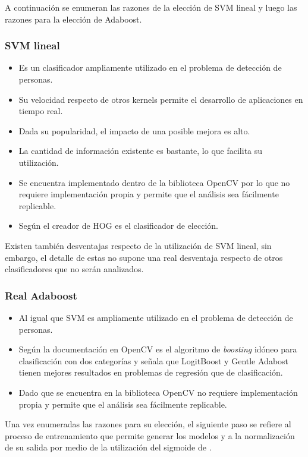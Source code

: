 A continuación se enumeran las razones de la elección de SVM lineal y luego las razones para la elección de Adaboost.

\subsubsection{SVM lineal}

\begin{itemize}
\item Es un clasificador ampliamente utilizado en el problema de detección de personas.
\item Su velocidad respecto de otros kernels permite el desarrollo de aplicaciones en tiempo real.
\item Dada su popularidad, el impacto de una posible mejora es alto.
\item La cantidad de información existente es bastante, lo que facilita su utilización.
\item Se encuentra implementado dentro de la biblioteca OpenCV por lo que no requiere implementación propia y permite que el análisis sea fácilmente replicable.
\item Según el creador de HOG \citep{dalal2006} es el clasificador de elección.
\end{itemize}

Existen también desventajas respecto de la utilización de SVM lineal, sin embargo, el detalle de estas no supone una real desventaja respecto de otros clasificadores que no serán analizados.

\subsubsection{ Real Adaboost}

\begin{itemize}
\item Al igual que SVM es ampliamente utilizado en el problema de detección de personas.
\item Según la documentación en OpenCV es el algoritmo de \textit{boosting} idóneo para clasificación con dos categorías y señala que LogitBoost y Gentle Adabost tienen mejores resultados en problemas de regresión que de clasificación.
\item Dado que se encuentra en la biblioteca OpenCV no requiere implementación propia y permite que el análisis sea fácilmente replicable.
\end{itemize}

Una vez enumeradas las razones para su elección, el siguiente paso se refiere al proceso de entrenamiento que permite generar los modelos y a la normalización de su salida por medio de la utilización del sigmoide de \cite{Platt1999}.

